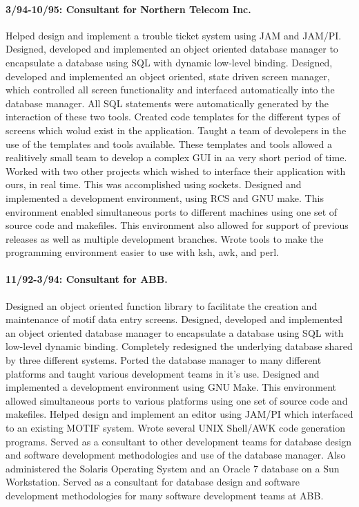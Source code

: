 \documentclass{article}
\begin{document}
\paragraph{3/94-10/95: Consultant for Northern Telecom Inc.}          
Helped design and implement a trouble ticket system using JAM and JAM/PI.
Designed, developed and implemented an object oriented database manager to encapsulate a 
database using SQL with dynamic low-level binding.  Designed, developed and implemented an
object oriented, state driven screen manager, which controlled all screen functionality and interfaced automatically into the database manager.  All SQL statements were automatically generated by the interaction of these two tools.  Created code templates for the different types of screens which wolud exist in the application.  Taught a team of devolepers in the use of the templates and tools available.  These templates and tools allowed a realitively small team to develop a complex GUI in aa very short period of time.  Worked with two other projects which wished to interface their application with ours, in real time.  This was accomplished using sockets.  Designed and implemented a development environment, using RCS and GNU make.  This environment enabled simultaneous ports to different machines using one set of source code and makefiles.  This environment also allowed for
support of previous releases as well as multiple development branches.  Wrote tools to make the programming environment easier to use with ksh, awk, and perl.

\paragraph{11/92-3/94: Consultant for ABB.}
Designed an object oriented function library to facilitate the creation and maintenance of motif data entry screens.  Designed, developed and implemented an object oriented database manager to encapsulate a database using SQL with low-level dynamic binding.  Completely redesigned the underlying database shared by three different systems.  Ported the database manager to many different platforms and taught various development teams in it's use.  Designed and implemented a development environment using GNU Make.  This environment allowed simultaneous ports to various platforms using one set of source code and makefiles.  Helped design and implement an editor using JAM/PI which interfaced to an existing MOTIF system.  Wrote several UNIX Shell/AWK code generation programs.  Served as a consultant to other development teams for database design and software development methodologies and use of the database manager.  Also administered the Solaris Operating System and an Oracle 7 database on a Sun Workstation.  Served as a consultant for database design and software development methodologies for many software development teams at ABB.
\end{document}
